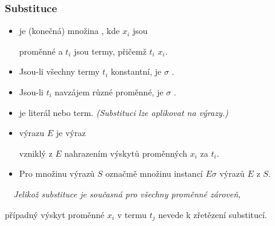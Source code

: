     
    
    
    \subsubsection*{Substituce}
    
    \begin{itemize}
    \item {} je (konečná) množina , kde $x_i$ jsou
    \smallskip
    
     proměnné a $t_i$ jsou termy, přičemž $t_i$  $x_i$.
    \smallskip
    
    \item Jsou-li všechny termy $t_i$ konstantní, je $\sigma$ .
    \smallskip
    
    \item Jsou-li $t_i$ navzájem různé proměnné, je $\sigma$ .
    \smallskip
    
    \item {} je literál nebo term. \emph{(Substituci lze aplikovat na výrazy.)}
    \smallskip
    
    \item {} výrazu $E$   je výraz 
    \smallskip
    
    vzniklý z $E$  nahrazením  výskytů proměnných $x_i$ za $t_i$.
    \smallskip
    
    \item Pro množinu výrazů $S$ označmě  množinu instancí $E\sigma$ výrazů $E$ z $S$.
    \end{itemize}
    \smallskip
    
    {\it {}\ \ Jelikož substituce je současná pro všechny proměnné zároveň,
    \smallskip
    
    případný výskyt proměnné $x_i$ v termu $t_j$ nevede k zřetězení substitucí.}
    \medskip
    
    
    \vspace{-6mm}
    
